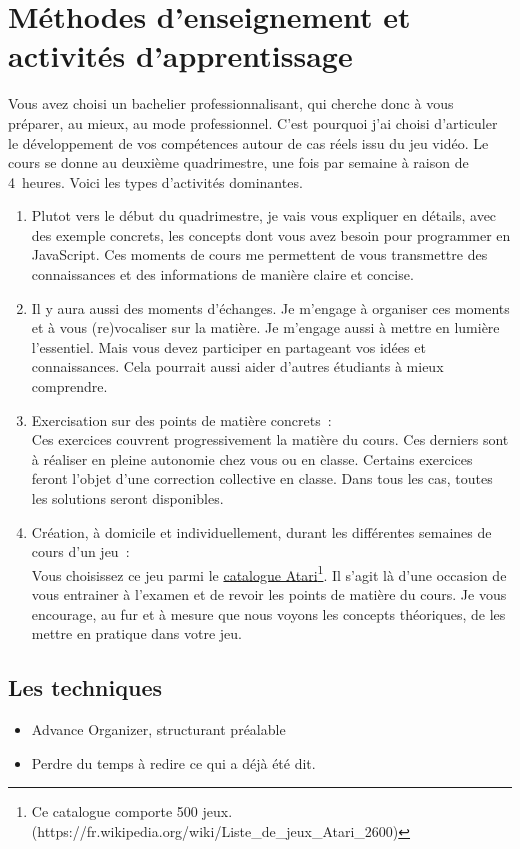 \clearpage
\section{Méthodes d’enseignement et activités d’apprentissage}
Vous avez choisi un bachelier professionnalisant, qui cherche donc à vous préparer, au mieux, au mode professionnel. C’est pourquoi j’ai choisi d’articuler le développement de vos compétences autour de cas réels issu du jeu vidéo. Le cours se donne au deuxième quadrimestre, une fois par semaine à raison de 4~heures. Voici les types d'activités dominantes.
\begin{enumerate}
    \item Plutot vers le début du quadrimestre, je vais vous expliquer en détails, avec des exemple concrets, les concepts dont vous avez besoin pour programmer en JavaScript. Ces moments de cours me permettent de vous transmettre des connaissances et des informations de manière claire et concise.
    \item Il y aura aussi des moments d'échanges. Je m'engage à organiser ces moments et à vous (re)vocaliser sur la matière. Je m'engage aussi à mettre en lumière l'essentiel. Mais vous devez participer en partageant vos idées et connaissances. Cela pourrait aussi aider d'autres étudiants à mieux comprendre.
    \item Exercisation sur des points de matière concrets~:\\Ces exercices couvrent progressivement la matière du cours. Ces derniers sont à réaliser en pleine autonomie chez vous ou en classe. Certains exercices feront l'objet d'une correction collective en classe. Dans tous les cas, toutes les solutions seront disponibles.
    \item Création, à domicile et individuellement, durant les différentes semaines de cours d’un jeu~:\\Vous choisissez ce jeu parmi le \href{https://fr.wikipedia.org/wiki/Liste_de_jeux_Atari_2600}{catalogue Atari}\footnote{Ce catalogue comporte 500 jeux.(https://fr.wikipedia.org/wiki/Liste\_de\_jeux\_Atari\_2600)}. Il s’agit là d’une occasion de vous entrainer à l’examen et de revoir les points de matière du cours. Je vous encourage, au fur et à mesure que nous voyons les concepts théoriques, de les mettre en pratique dans votre jeu.
\end{enumerate}
\subsection{Les techniques}
\begin{itemize}
    \item Advance Organizer, structurant préalable
    \item Perdre du temps à redire ce qui a déjà été dit.
\end{itemize}




